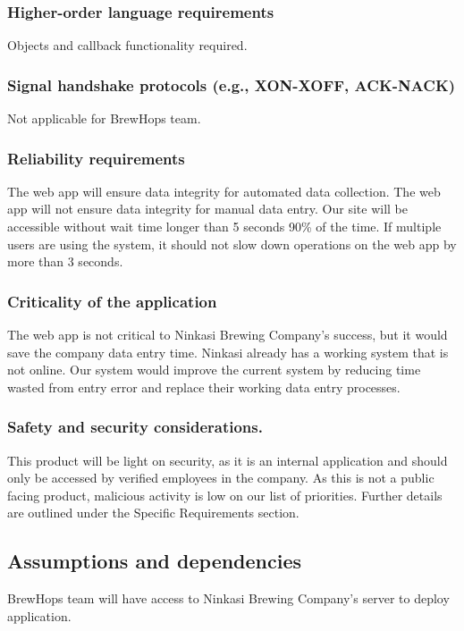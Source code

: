 \documentclass[draftclsnofoot,onecolumn,letterpaper,10pt,compsoc]{IEEEtran}
\begin{document}
		\subsubsection{Higher-order language requirements}
        Objects and callback functionality required.

		\subsubsection{Signal handshake protocols (e.g., XON-XOFF, ACK-NACK)}
        Not applicable for BrewHops team.

		\subsubsection{Reliability requirements}
		The web app will ensure data integrity for automated data collection.
		The web app will not ensure data integrity for manual data entry.
		Our site will be accessible without wait time longer than 5 seconds 90\% of the time.
		If multiple users are using the system, it should not slow down operations on the web app by more than 3 seconds.


		\subsubsection{Criticality of the application}
		The web app is not critical to Ninkasi Brewing Company’s success, but it would save the company data entry time.
		Ninkasi already has a working system that is not online.
		Our system would improve the current system by reducing time wasted from entry error and replace their working data entry processes.


		\subsubsection{Safety and security considerations.}
		This product will be light on security, as it is an internal application and should only be accessed by verified employees in the company.
		As this is not a public facing product, malicious activity is low on our list of priorities.
		Further details are outlined under the Specific Requirements section.

	\subsection{Assumptions and dependencies}
    BrewHops team will have access to Ninkasi Brewing Company's server to deploy application.
\end{document}
